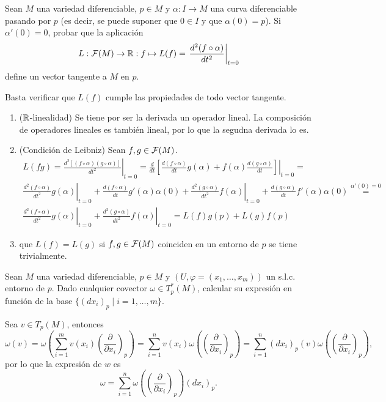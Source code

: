 \documentclass[twoside]{article}
\begin{document}
\newpage

\begin{ejercicio}{3}
Sean $M$ una variedad diferenciable, $p \in M$ y $\alpha : I \to M$ una curva diferenciable
pasando por $p$ (es decir, se puede suponer que $0 \in I$ y que $\alpha(0) = p$).
Si $\alpha'(0) = 0$, probar que la aplicación
$$L:\mathcal{F}(M)\to\mathbb{R}:f\mapsto L(f)=\left.\frac{d^2(f\circ\alpha)}{dt^2}\right|_{t=0}$$
define un vector tangente a $M$ en $p$.
\end{ejercicio}
\begin{solucion}
Basta verificar que $L(f)$ cumple las propiedades de todo vector tangente. 
\begin{enumerate}
\item ($\mathbb{R}$-linealidad) Se tiene por ser la derivada un operador lineal. La composición de operadores lineales es también lineal, por lo que la segudna derivada lo es.
\item (Condición de Leibniz) Sean $f,g\in\mathcal{F}(M)$. 
\begin{gather*}
L(fg)=\left.\frac{d^2[(f\circ\alpha)(g\circ\alpha)]}{dt^2}\right|_{t=0}=\left.\frac{d}{dt}\left[\frac{d(f\circ\alpha)}{dt}g(\alpha)+f(\alpha)\frac{d(g\circ\alpha)}{dt}\right]\right|_{t=0}=\\
\left.\frac{d^2(f\circ\alpha)}{dt^2}g(\alpha)\right|_{t=0}+\frac{d(f\circ\alpha)}{dt}g'(\alpha)\alpha(0)+\left.\frac{d^2(g\circ\alpha)}{dt^2}f(\alpha)\right|_{t=0}+\frac{d(g\circ\alpha)}{dt}f'(\alpha)\alpha(0)\overset{\alpha'(0)=0}{=}\\
\left.\frac{d^2(f\circ\alpha)}{dt^2}g(\alpha)\right|_{t=0}+\left.\frac{d^2(g\circ\alpha)}{dt^2}f(\alpha)\right|_{t=0}=L(f)g(p)+L(g)f(p)
\end{gather*}
\item que $L(f)=L(g)$ si $f,g\in\mathcal{F}(M)$ coinciden en un entorno de $p$ se tiene trivialmente.
\end{enumerate}
\end{solucion}

\newpage

\begin{ejercicio}{4}
Sean $M$ una variedad diferenciable, $p \in M$ y $(U, \varphi = (x_1, \dots , x_m))$ un s.l.c.
entorno de $p$. Dado cualquier covector $\omega \in T^*_p (M)$, calcular su expresión en
función de la base $\{(dx_i)_p \mid i = 1, \dots ,m\}$.
\end{ejercicio}
\begin{solucion}
Sea $v\in T_p(M)$, entonces
\[
\omega(v)=\omega\left(\sum_{i=1}^m v(x_i)\left(\frac{\partial}{\partial x_i}\right)_p\right)=\sum_{i=1}^nv(x_i)\omega\left(\left(\frac{\partial}{\partial x_i}\right)_p\right)=\sum_{i=1}^n(dx_i)_p(v)\omega\left(\left(\frac{\partial}{\partial x_i}\right)_p\right),
\]
por lo que la expresión de $w$ es
$$\omega=\sum_{i=1}^n\omega\left(\left(\frac{\partial}{\partial x_i}\right)_p\right)(dx_i)_p.$$
\end{solucion}
\end{document}
